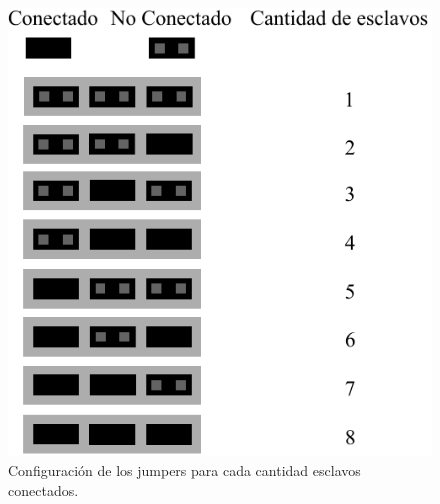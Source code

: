 \begin{figure}[ht!]
	\centering
	\includegraphics[width=\linewidth]{imagenes/jumper.pdf}
	\caption{Configuración de los jumpers para cada cantidad esclavos conectados.}
	\label{fig:manual-jumpers}
\end{figure}